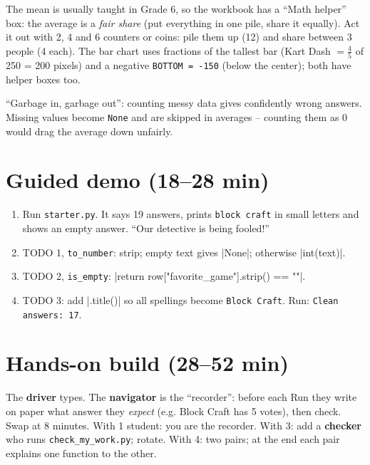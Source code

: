 \begin{teachernote}
The mean is usually taught in Grade 6, so the workbook has a \enquote{Math helper} box: the average is a \emph{fair share} (put everything in one pile, share it equally). Act it out with 2, 4 and 6 counters or coins: pile them up (12) and share between 3 people (4 each). The bar chart uses fractions of the tallest bar (Kart Dash $= \frac{4}{5}$ of 250 = 200 pixels) and a negative \texttt{BOTTOM = -150} (below the center); both have helper boxes too.
\end{teachernote}

\begin{teachernote}
\enquote{Garbage in, garbage out}: counting messy data gives confidently wrong answers. Missing values become \texttt{None} and are skipped in averages -- counting them as 0 would drag the average down unfairly.
\end{teachernote}

\section{Guided demo (18--28 min)}
\begin{workedexample}
\begin{enumerate}[itemsep=1pt]
  \item Run \texttt{starter.py}. It says 19 answers, prints \texttt{block craft} in small letters and shows an empty answer. \enquote{Our detective is being fooled!}
  \item TODO 1, \texttt{to\_number}: strip; empty text gives \py|None|; otherwise \py|int(text)|.
  \item TODO 2, \texttt{is\_empty}: \py|return row["favorite_game"].strip() == ""|.
  \item TODO 3: add \py|.title()| so all spellings become \texttt{Block Craft}. Run: \texttt{Clean answers: 17}.
\end{enumerate}
\end{workedexample}

\section{Hands-on build (28--52 min)}
\begin{pairroles}
The \textbf{driver} types. The \textbf{navigator} is the \enquote{recorder}: before each Run they write on paper what answer they \emph{expect} (e.g. Block Craft has 5 votes), then check. Swap at 8 minutes. With 1 student: you are the recorder. With 3: add a \textbf{checker} who runs \texttt{check\_my\_work.py}; rotate. With 4: two pairs; at the end each pair explains one function to the other.
\end{pairroles}

